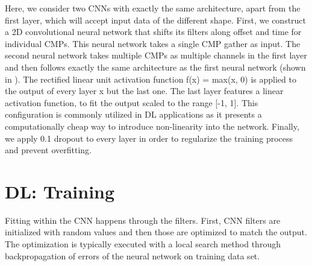\documentclass[paper,twocolomn]{geophysics}
\begin{document}
Here, we consider two CNNs with exactly the same architecture, apart from the first layer, which will accept input data of the different shape.
%
First, we construct a 2D convolutional neural network that shifts its filters along offset and time for individual CMPs. This neural network takes a single CMP gather as input.
The second neural network takes multiple CMPs as multiple channels in the first layer and then follows exactly the same architecture as the first neural network (shown in ).
The rectified linear unit activation function 
\beq
f(x) = max(x, 0)
\eeq
is applied to the output of every layer x but the last one. The last layer features a linear activation function, to fit the output scaled to the range [-1, 1]. This configuration is commonly utilized in DL applications as it presents a computationally cheap way to introduce non-linearity into the network. 
Finally, we apply 0.1 dropout to every layer in order to regularize the training process and prevent overfitting. 







\section{DL: Training}
Fitting within the CNN happens through the filters. First, CNN filters are initialized with random values and then those are optimized to match the output. The optimization is typically executed with a local search method through backpropagation of errors of the neural network on training data set. 
\end{document}
